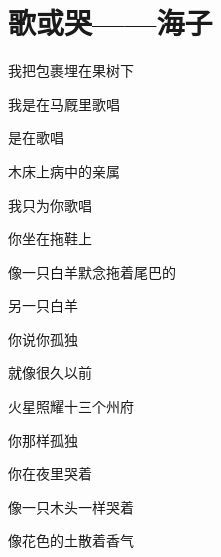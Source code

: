 \section{歌或哭——海子}
我把包裹埋在果树下

我是在马厩里歌唱

是在歌唱

木床上病中的亲属

我只为你歌唱

你坐在拖鞋上

像一只白羊默念拖着尾巴的

另一只白羊

你说你孤独

就像很久以前

火星照耀十三个州府

你那样孤独

你在夜里哭着

像一只木头一样哭着

像花色的土散着香气
